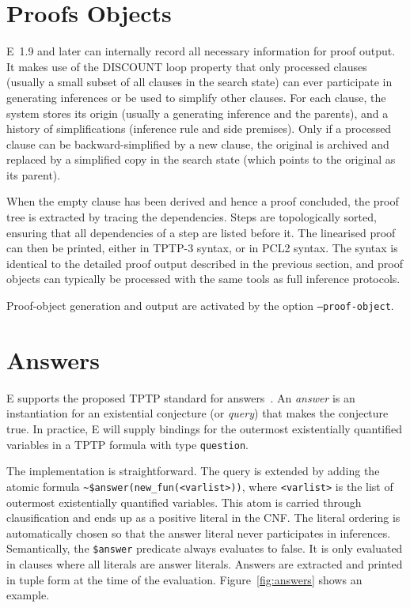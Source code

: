 \documentclass{report}
\begin{document}
\section{Proofs Objects}

E~1.9 and later can internally record all necessary information for
proof output. It makes use of the DISCOUNT loop property that only
processed clauses (usually a small subset of all clauses in the search
state) can ever participate in generating inferences or be used to
simplify other clauses. For each clause, the system stores its origin
(usually a generating inference and the parents), and a history of
simplifications (inference rule and side premises). Only if a
processed clause can be backward-simplified by a new clause, the
original is archived and replaced by a simplified copy in the search
state (which points to the original as its parent).

When the empty clause has been derived and hence a proof concluded,
the proof tree is extracted by tracing the dependencies. Steps are
topologically sorted, ensuring that all dependencies of a step are
listed before it. The linearised proof can then be printed, either in
TPTP-3 syntax, or in PCL2 syntax. The syntax is identical to the
detailed proof output described in the previous section, and proof
objects can typically be processed with the same tools as full
inference protocols.

Proof-object generation and output are activated by the option
\texttt{--proof-object}.


\section{Answers}

E supports the proposed TPTP standard for
answers~\cite{SSSU:TPTP-ANS}. An \emph{answer} is an instantiation for
an existential conjecture (or \emph{query}) that makes the conjecture
true. In practice, E will supply bindings for the outermost
existentially quantified variables in a TPTP formula with type
\texttt{question}.

The implementation is straightforward. The query is extended by adding
the atomic formula \verb|~$answer(new_fun(<varlist>))|, where
\verb|<varlist>| is the list of outermost existentially quantified
variables. This atom is carried through clausification and ends up as
a positive literal in the CNF. The literal ordering is automatically
chosen so that the answer literal never participates in
inferences. Semantically, the \verb|$answer| predicate always
evaluates to false. It is only evaluated in clauses where all literals
are answer literals. Answers are extracted and printed in tuple form
at the time of the evaluation. Figure~\ref{fig:answers} shows an
example.
\end{document}
